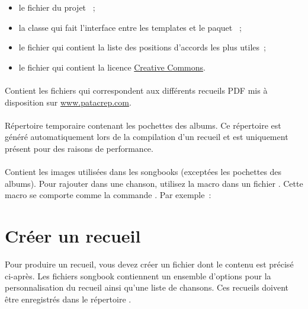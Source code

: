 \begin{itemize}
\item le fichier  du projet \songs~;
\item la classe  qui fait l'interface entre les
  templates et le paquet ~;
\item le fichier  qui contient la liste des positions
  d'accords les plus utiles~;
\item le fichier  qui contient la licence
  \href{http://creativecommons.org/}{Creative Commons}.
\end{itemize}

\paragraph{}
Contient les fichiers  qui correspondent aux différents
recueils PDF mis à disposition sur \url{www.patacrep.com}.

\paragraph{}
Répertoire temporaire contenant les pochettes des albums. Ce
répertoire est généré automatiquement lors de la compilation d'un
recueil et est uniquement présent pour des raisons de performance.

\paragraph{}
Contient les images utilisées dans les songbooks (exceptées les
pochettes des albums). Pour rajouter  dans une
chanson, utilisez la macro  dans un fichier
. Cette macro se comporte comme la commande \latex
{}. Par exemple~:

\begin{song}
\end{song}

\section{Créer un recueil}
\label{sec:create-songbook}

Pour produire un recueil, vous devez créer un fichier  dont le
contenu est précisé ci-après. Les fichiers songbook 
contiennent un ensemble d'options pour la personnalisation du recueil
ainsi qu'une liste de chansons. Ces recueils doivent être enregistrés
dans le répertoire .

